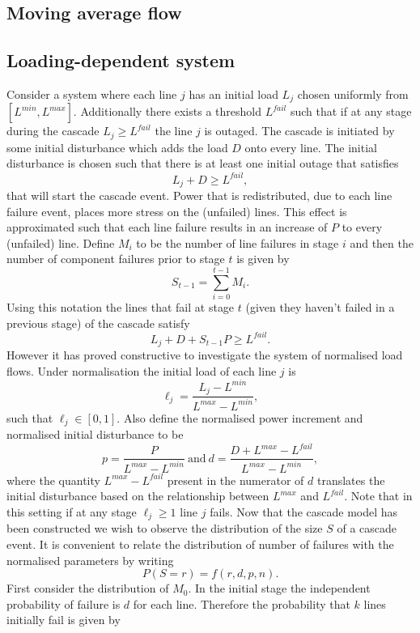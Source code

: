 \documentclass{article}
\renewcommand{\l}{\ell}
\begin{document}
\subsection{Moving average flow}

\subsection{Loading-dependent system}

Consider a system where each line $j$ has an initial load $L_j$ chosen uniformly from $[L^{min}, L^{max}]$. Additionally there exists a threshold $L^{fail}$ such that if at any stage during the cascade $L_j\ge L^{fail}$ the line $j$ is outaged. The cascade is initiated by some initial disturbance which adds the load $D$ onto every line. The initial disturbance is chosen such that there is at least one initial outage that satisfies
\[ L_j + D \ge L^{fail},\]
that will start the cascade event. Power that is redistributed, due to each line failure event, places more stress on the (unfailed) lines. This effect is approximated such that each line failure results in an increase of $P$ to every (unfailed) line. Define $M_i$ to be the number of line failures in stage $i$ and then the number of component failures prior to stage $t$ is given by
\[S_{t-1} = \sum_{i=0}^{t-1} M_i.\]
Using this notation the lines that fail at stage $t$ (given they haven't failed in a previous stage) of the cascade satisfy
\[ L_j+D+S_{t-1}P \ge L^{fail}.\]
However it has proved constructive to investigate the system of normalised load flows. Under normalisation the initial load of each line $j$ is 
\[\ell_j = \frac{L_j-L^{min}}{L^{max}-L^{min}},\]
such that $\l_j \in [0,1]$. Also define the normalised power increment and normalised initial disturbance to be
\[p = \frac{P}{L^{max}-L^{min}} \ \text{and} \  d = \frac{D+L^{max}-L^{fail}}{L^{max}-L^{min}},\]
where the quantity $L^{max}-L^{fail}$ present in the numerator of $d$ translates the initial disturbance based on the relationship between $L^{max}$ and $L^{fail}$. Note that in this setting if at any stage $\l_j \ge 1$ line $j$ fails. Now that the cascade model has been constructed we wish to observe the distribution of the size $S$ of a cascade event. It is convenient to relate the distribution of number of failures with the normalised parameters by writing
\[P(S=r) = f(r,d,p,n).\]
 First consider the distribution of $M_0$. In the initial stage the independent probability of failure is $d$ for each line. Therefore the probability that $k$ lines initially fail is given by
\end{document}
